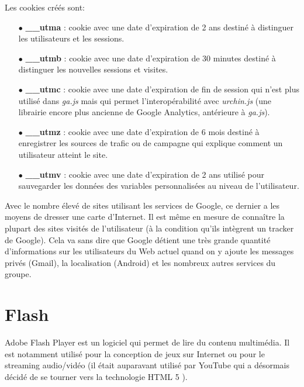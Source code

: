 Les cookies créés sont:
\begin{itemize}
  \item[$\bullet$] \textbf{\_\_utma} : cookie avec une date d'expiration de 2 ans destiné à distinguer les utilisateurs et les sessions.
  \item[$\bullet$] \textbf{\_\_utmb} : cookie avec une date d'expiration de 30 minutes destiné à distinguer les nouvelles sessions et visites.
  \item[$\bullet$] \textbf{\_\_utmc} : cookie avec une date d'expiration de fin de session qui n'est plus utilisé dans \textit{ga.js} mais qui permet l'interopérabilité avec \textit{urchin.js} (une librairie encore plus ancienne de Google Analytics, antérieure à \textit{ga.js}).
  \item[$\bullet$] \textbf{\_\_utmz} : cookie avec une date d'expiration de 6 mois destiné à enregistrer les sources de trafic ou de campagne qui explique comment un utilisateur atteint le site.
  \item[$\bullet$] \textbf{\_\_utmv} : cookie avec une date d'expiration de 2 ans utilisé pour sauvegarder les données des variables personnalisées au niveau de l'utilisateur.
  \newline
\end{itemize}

Avec le nombre élevé de sites utilisant les services de Google, ce dernier a les moyens de dresser une carte d'Internet. Il est même en mesure de connaître la plupart des sites visités de l'utilisateur (à la condition qu'ils intègrent un tracker de Google). Cela va sans dire que Google détient une très grande quantité d'informations sur les utilisateurs du Web actuel quand on y ajoute les messages privés (Gmail), la localisation (Android) et les nombreux autres services du groupe.

\section{Flash}
\label{flash}
Adobe Flash Player \cite{flash_website} est un logiciel qui permet de lire du contenu multimédia. Il est notamment utilisé pour la conception de jeux sur Internet ou pour le streaming audio/vidéo (il était auparavant utilisé par YouTube qui a désormais décidé de se tourner vers la technologie HTML 5 \cite{youtube_html5}).
\newline

